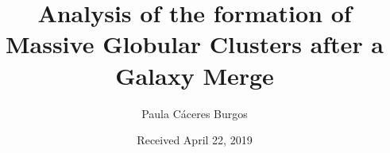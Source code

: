 \documentclass{aa}
\begin{document}
 


   \title{Analysis of the formation of Massive Globular Clusters after a Galaxy Merge}


   \author{Paula Cáceres Burgos}


   \date{Received April 22, 2019}

 
  \abstract

\end{document}
